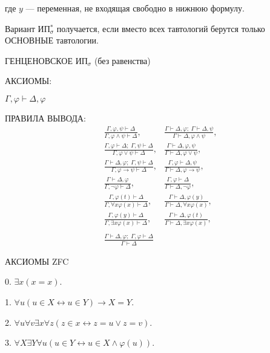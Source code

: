\documentclass[a4paper,11pt]{article}
\begin{document}
где $y$ --- переменная, не входящая свободно в нижнюю формулу.
\medskip

Вариант ИП$^*_\sigma$ получается, если вместо всех тавтологий берутся только ОСНОВНЫЕ тавтологии.

\pagebreak


ГЕНЦЕНОВСКОЕ  ИП$_\sigma$ (без равенства)

АКСИОМЫ: 
\medskip

$\Gamma,\varphi\vdash \Delta,\varphi$

\medskip


ПРАВИЛА ВЫВОДА:
\medskip
\begin{align*}
&\frac{\Gamma,\varphi,\psi\vdash\Delta}{\Gamma,\varphi\land\psi\vdash\Delta},&
\frac{\Gamma\vdash\Delta,\varphi;\;\Gamma\vdash\Delta,\psi}{\Gamma\vdash\Delta,\varphi\land\psi},
\\
&\frac{\Gamma,\varphi\vdash\Delta;\;\Gamma,\psi\vdash\Delta}{\Gamma,\varphi\lor\psi\vdash\Delta},&
\frac{\Gamma\vdash\Delta,\varphi,\psi}{\Gamma\vdash\Delta,\varphi\lor\psi},
\\
&\frac{\Gamma\vdash\Delta,\varphi;\;\Gamma,\psi\vdash\Delta}{\Gamma,\varphi\rightarrow\psi\vdash\Delta},&
\frac{\Gamma,\varphi\vdash\Delta,\psi}{\Gamma\vdash\Delta,\varphi\rightarrow\psi},
\\
&\frac{\Gamma\vdash\Delta,\varphi}{\Gamma,\neg\varphi\vdash\Delta},&
\frac{\Gamma,\varphi\vdash\Delta}{\Gamma\vdash\Delta,\neg\varphi},
\\
&\frac{\Gamma,\varphi(t)\vdash\Delta}{\Gamma,\forall x\varphi(x)\vdash\Delta}, &
\frac{\Gamma\vdash\Delta,\varphi(y)}{\Gamma\vdash\Delta,\forall x\varphi(x)},
\\
&\frac{\Gamma,\varphi(y)\vdash\Delta}{\Gamma,\exists x\varphi(x)\vdash\Delta}, &
\frac{\Gamma\vdash\Delta,\varphi(t)}{\Gamma\vdash\Delta,\exists x\varphi(x)},
\\\\
&\frac{\Gamma\vdash\Delta,\varphi;\;\Gamma,\varphi\vdash\Delta}{\Gamma\vdash\Delta}
\end{align*}




АКСИОМЫ ZFC
\medskip

0. $\exists x(x=x)$.

1. $\forall u(u\in X\leftrightarrow u\in Y)\to X=Y$.

2. $\forall u\forall v\exists x\forall z(z\in x\leftrightarrow z=u\lor z=v)$.

3. $\forall X\exists Y\forall u(u\in Y\leftrightarrow u\in X\land\varphi(u))$.
\end{document}
